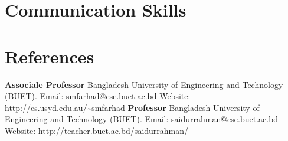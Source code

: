 \documentclass[11pt,a4paper,sans]{moderncv}
\begin{document}
\section{Communication Skills}





\section{References}
{
\textbf{Associale Professor\newline}
Bangladesh University of Engineering and Technology (BUET).\newline
Email: \url{smfarhad@cse.buet.ac.bd} \newline
Website: \url{http://cs.usyd.edu.au/~smfarhad}
}
{
\textbf{Professor\newline}
Bangladesh University of Engineering and Technology (BUET).\newline
Email: \url{saidurrahman@cse.buet.ac.bd} \newline
Website: \url{http://teacher.buet.ac.bd/saidurrahman/}
}
\end{document}
